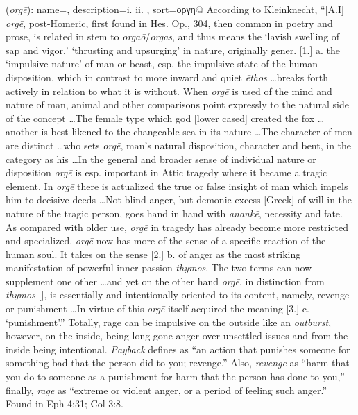 \item[Rage,]

(\textit{orgē}):
{
    name=,
    description={i.  ii. },
    sort=οργη@
}
According to Kleinknecht, ``[A.I] \emph{orgē}, post-Homeric, first found in Hes. Op., 304, then common in poetry and prose, is related in stem to \emph{orgaō}/\emph{orgas}, and thus means the `lavish swelling of sap and vigor,' `thrusting and upsurging' in nature, originally gener. [1.] a. the `impulsive nature' of man or beast, esp. the impulsive state of the human disposition, which in contrast to more inward and quiet \emph{ēthos} \ldots breaks forth actively in relation to what it is without. When \emph{orgē} is used of the mind and nature of man, animal and other comparisons point expressly to the natural side of the concept \ldots The female type which god [lower cased] created the fox \ldots another is best likened to the changeable sea in its nature \ldots The character of men are distinct \ldots who sets \emph{orgē}, man's natural disposition, character and bent, in the category as his \ldots In the general and broader sense of individual nature or disposition \emph{orgē} is esp. important in Attic tragedy where it became a tragic element. In \emph{orgē} there is actualized the true or false insight of man which impels him to decisive deeds \ldots Not blind anger, but demonic excess [Greek] of will in the nature of the tragic person, goes hand in hand with \emph{anankē}, necessity and fate. As compared with older use, \emph{orgē} in tragedy has already become more restricted and specialized. \emph{orgē} now has more of the sense of a specific reaction of the human soul. It takes on the sense [2.] b. of anger as the most striking manifestation of powerful inner passion \emph{thymos}. The two terms can now supplement one other \ldots and yet on the other hand  \emph{orgē}, in distinction from \emph{thymos} [], is essentially and intentionally oriented to its content, namely, revenge or punishment \ldots In virtue of this \emph{orgē} itself acquired the meaning [3.] c. `punishment'.'' 
Totally, rage can be impulsive on the outside like an \emph{outburst}, however, on the inside, being long gone anger over unsettled issues and from the inside being intentional. \emph{Payback} defines as ``an action that punishes someone for something bad that the person did to you; revenge.'' Also, \emph{revenge} as ``harm that you do to someone as a punishment for harm that the person has done to you,'' finally, \emph{rage} as ``extreme or violent anger, or a period of feeling such anger.''
Found in Eph 4:31; Col 3:8.
